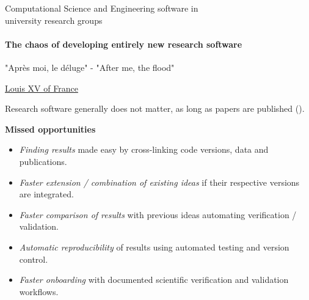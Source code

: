\begin{frame}{Computational Science and Engineering software in\\university research groups}
    \framesubtitle{The chaos of developing entirely new research software}
    \vfill

    \epigraph{"Après moi, le déluge" - "After me, the flood"}{\href{https://en.wikipedia.org/wiki/Apr\%C3\%A8s_moi,_le_d\%C3\%A9luge}{Louis XV of France}}

    Research software generally does not matter, as long as papers are published (\faGraduationCap).
    
    \medskip

    \textbf{Missed opportunities}
    \begin{itemize}
        \item \emph{Finding results} made easy by cross-linking code versions, data and publications. 
        \item \emph{Faster extension / combination of existing ideas} if their respective versions are integrated. 
        \item \emph{Faster comparison of results} with previous ideas automating verification / validation. 
        \item \emph{Automatic reproducibility} of results using automated testing and version control. 
        \item \emph{Faster onboarding} with documented scientific verification and validation workflows. 
    \end{itemize}

\end{frame}

